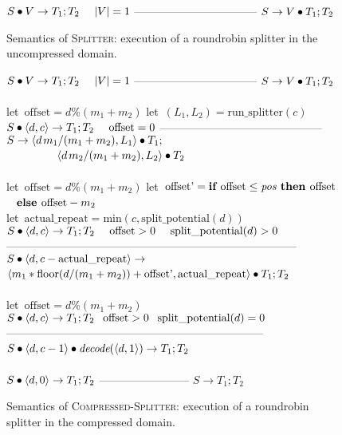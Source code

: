 \begin{figure}[t]
$S \bullet V \rightarrow T_1; T_2~~~~|V|=1$\skiptopb
---------------------------------\skipbot
$S \rightarrow V \bullet T_1; T_2$
\caption{Semantics of \textsc{Splitter}: execution of a roundrobin
  splitter in the uncompressed domain.
 \protect\label{fig:uncompressed-splitter}}
\end{figure}

\begin{figure}[t]
$S \bullet V \rightarrow T_1; T_2~~~~|V|=1$\skiptopb
---------------------------------\skipbot
$S \rightarrow V \bullet T_1; T_2$
~ \\ ~ \\
let~$\mbox{offset} = d$\%$(m_1+m_2)$\skiptopb
let~$(L_1, L_2) = \mbox{run\_splitter}(c)$\vspace{2pt}\\
$S \bullet \langle d, c\rangle \rightarrow T_1; T_2~~~~\mbox{offset} = 0$\vspace{-3pt}\skiptopa
--------------------------------------------\skipbot
$S \rightarrow \langle d{\hspace{1.3pt}}m_1/(m_1+m_2), L_1\rangle \bullet T_1;$\\
\mbox{~~~~~~~~~}\hspace{0.29pt}$\langle d{\hspace{1.3pt}}m_2/(m_1+m_2), L_2\rangle \bullet T_2$
~ \\ ~ \\
let~$\mbox{offset} = d$\%$(m_1+m_2)$\skiptopb
let~$\mbox{offset'} = \mbox{\bf if~} \mbox{offset} \leq \mbox{\it pos} \mbox{\bf ~then~} \mbox{offset}$\\
\mbox{~}\hspace{42.3pt}$\mbox{\bf ~else~} \mbox{offset} - m_2$\\
let~$\mbox{actual\_repeat} = \mbox{min}(c, \mbox{split\_potential}(d))$\\
$S \bullet \langle d, c\rangle \rightarrow T_1; T_2~~~~\mbox{offset} > 0~~~~\mbox{split\_potential}(d) > 0$\skiptopb
------------------------------------------------------------------------------\skipbot
$S \bullet \langle d, c - \mbox{actual\_repeat}\rangle \rightarrow$\\
$\langle m_1*\mbox{floor}(d / (m_1 + m_2)) + \mbox{offset'}, \mbox{actual\_repeat}\rangle \bullet T_1; T_2$
~ \\ ~ \\
let~$\mbox{offset} = d$\%$(m_1+m_2)$\skiptopb
$S \bullet \langle d, c\rangle \rightarrow T_1; T_2~~\hspace{1pt}\mbox{offset} > 0~~\hspace{1pt}\mbox{split\_potential}(d) = 0$\skiptopb
---------------------------------------------------------------------\skipbot
$S \bullet \langle d, c-1\rangle \bullet \mbox{\it decode}(\langle d, 1\rangle) \rightarrow T_1; T_2$
~ \\ ~ \\
$S \bullet \langle d, 0\rangle \rightarrow T_1; T_2$\skiptopb
------------------------\skipbot
$S \rightarrow T_1; T_2$
\caption{Semantics of \textsc{Compressed-Splitter}:  execution of a roundrobin
splitter in the compressed domain.
\protect\label{fig:compressed-splitter}}
\end{figure}

